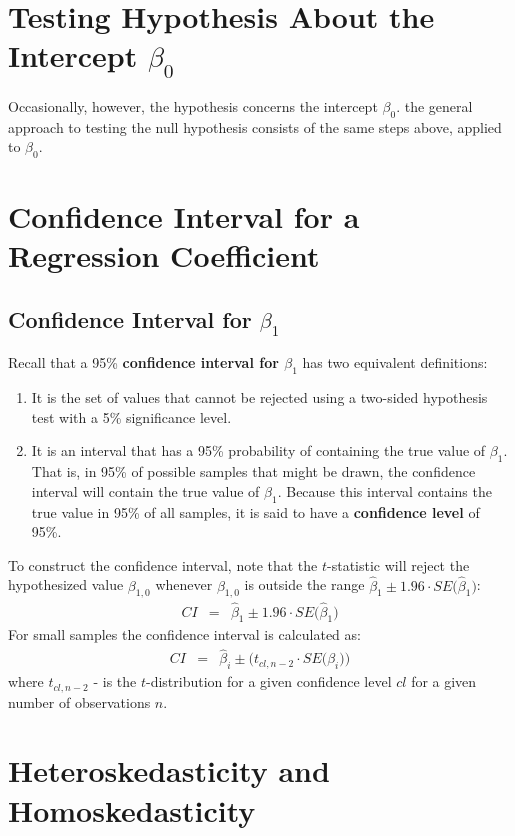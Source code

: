 \section{Testing Hypothesis About the Intercept \texorpdfstring{$\beta_{0}$}{Beta0}}
Occasionally, however, the hypothesis concerns the intercept $\beta_{0}$. the general approach to testing the null hypothesis consists of the same steps above, applied to $\beta_{0}$.

\section{Confidence Interval for a Regression Coefficient}

\subsection{Confidence Interval for \texorpdfstring{$\beta_{1}$}{Beta1}}
Recall that a 95\% \textbf{\color{ForestGreen} confidence interval for $\beta_{1}$} has two equivalent definitions:
\begin{enumerate}
	\item It is the set of values that cannot be rejected using a two-sided hypothesis test with a 5\% significance level.
	\item It is an interval that has a 95\% probability of containing the true value of $\beta_{1}$. That is, in 95\% of possible samples that might be drawn, the confidence interval will contain the true value of $\beta_{1}$. Because this interval contains the true value in 95\% of all samples, it is said to have a \textbf{\color{ForestGreen} confidence level} of 95\%.
\end{enumerate}
To construct the confidence interval, note that the $t$-statistic will reject the hypothesized value $\beta_{1, 0}$ whenever $\beta_{1, 0}$ is outside the range $\hat{\beta}_{1} \pm 1.96\cdot SE\big(\hat{\beta}_{1}\big)$:
\begin{eqnarray}
	CI &=& \hat{\beta}_{1} \pm 1.96\cdot SE\big(\hat{\beta}_{1}\big)
\end{eqnarray}
For small samples the confidence interval is calculated as:
\begin{eqnarray}
	CI &=& \hat{\beta}_{i} \pm\big(t_{cl, n - 2}\cdot SE\big(\beta_{i}\big)\big)
\end{eqnarray}
where $t_{cl, n - 2}$ - is the $t$-distribution for a given confidence level $cl$ for a given number of observations $n$.


\section{Heteroskedasticity and Homoskedasticity}

